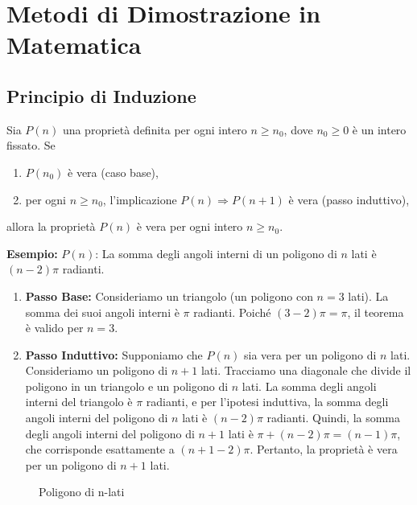 \documentclass{book}
\begin{document}
\section{Metodi di Dimostrazione in Matematica}
\noindent\begin{minipage}{\textwidth}
    \begin{theorem}
        \subsection{Principio di Induzione}
        Sia \( P(n) \) una proprietà definita per ogni intero \( n \geq n_0 \), dove \( n_0  \geq 0\) è un intero fissato. Se
        \begin{enumerate}
            \item \( P(n_0) \) è vera (caso base),
            \item per ogni \( n \geq n_0 \), l'implicazione \( P(n) \Rightarrow P(n+1) \) è vera (passo induttivo),
        \end{enumerate}
        allora la proprietà \( P(n) \) è vera per ogni intero \( n \geq n_0 \).

        \textbf{Esempio:}
        \(P(n)\): La somma degli angoli interni di un poligono di \( n \) lati è \( (n-2)\pi \) radianti.
        \begin{enumerate}
            \item \textbf{Passo Base:} Consideriamo un triangolo (un poligono con \( n = 3 \) lati). La somma dei suoi angoli interni è \( \pi \) radianti. Poiché \( (3-2)\pi = \pi \), il teorema è valido per \( n = 3 \).
            \item \textbf{Passo Induttivo:} Supponiamo che \( P(n) \) sia vera per un poligono di \( n \) lati. Consideriamo un poligono di \( n+1 \) lati. Tracciamo una diagonale che divide il poligono in un triangolo e un poligono di \( n \) lati. La somma degli angoli interni del triangolo è \( \pi \) radianti, e per l'ipotesi induttiva, la somma degli angoli interni del poligono di \( n \) lati è \( (n-2)\pi \) radianti. Quindi, la somma degli angoli interni del poligono di \( n+1 \) lati è \( \pi + (n-2)\pi = (n-1)\pi \), che corrisponde esattamente a \( (n+1-2)\pi \). Pertanto, la proprietà è vera per un poligono di \( n+1 \) lati.
        \end{enumerate}
    \end{theorem}
\end{minipage}
\begin{figure}[H]
    \centering
    \caption{Poligono di n-lati}
\end{figure}
\end{document}
